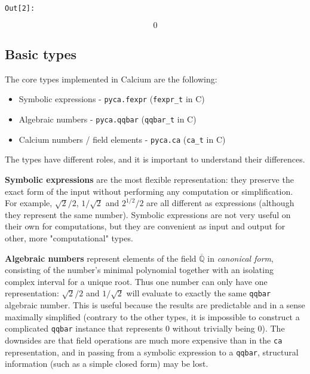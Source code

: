 \documentclass[11pt]{article}
\providecommand{\tightlist}{%
      \setlength{\itemsep}{0pt}\setlength{\parskip}{0pt}}
\begin{document}
\texttt{\color{outcolor}Out[{\color{outcolor}2}]:}
    
    $$0$$

    

    \subsection{Basic types}\label{basic-types}

    The core types implemented in Calcium are the following:

\begin{itemize}
\tightlist
\item
  Symbolic expressions - \texttt{pyca.fexpr} (\texttt{fexpr\_t} in C)
\item
  Algebraic numbers - \texttt{pyca.qqbar} (\texttt{qqbar\_t} in C)
\item
  Calcium numbers / field elements - \texttt{pyca.ca} (\texttt{ca\_t} in
  C)
\end{itemize}

The types have different roles, and it is important to understand their
differences.

\textbf{Symbolic expressions} are the most flexible representation: they
preserve the exact form of the input without performing any computation
or simplification. For example, \(\sqrt{2} / 2\), \(1 / \sqrt{2}\) and
\(2^{1/2} / 2\) are all different as expressions (although they
represent the same number). Symbolic expressions are not very useful on
their own for computations, but they are convenient as input and output
for other, more "computational" types.

\textbf{Algebraic numbers} represent elements of the field
\(\overline{\mathbb{Q}}\) in \emph{canonical form}, consisting of the
number's minimal polynomial together with an isolating complex interval
for a unique root. Thus one number can only have one representation:
\(\sqrt{2} / 2\) and \(1 / \sqrt{2}\) will evaluate to exactly the same
\texttt{qqbar} algebraic number. This is useful because the results are
predictable and in a sense maximally simplified (contrary to the other
types, it is impossible to construct a complicated \texttt{qqbar}
instance that represents 0 without trivially being 0). The downsides are
that field operations are much more expensive than in the \texttt{ca}
representation, and in passing from a symbolic expression to a
\texttt{qqbar}, structural information (such as a simple closed form)
may be lost.
\end{document}
